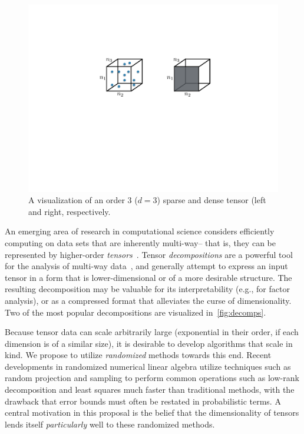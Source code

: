 \begin{figure}
  \centering 
  \includegraphics[width=0.6\linewidth]{thpropfigs/sparseanddense}
  \caption{A visualization of an order 3 ($d=3$) sparse and dense tensor (left and right, respectively.}
  \label{fig:sparseanddense}
\end{figure}
An emerging area of research in computational science considers efficiently computing on data sets that are 
inherently multi-way-- that is, they can be represented by higher-order \emph{tensors}~\cite{Acar09futuredirections}. 
%
%
Tensor \emph{decompositions} are a powerful tool for the analysis of multi-way data~\cite{Kolda:2009}, and generally attempt to express an input tensor in a form that is lower-dimensional or of a more desirable structure. The resulting decomposition may be valuable for its interpretability (e.g., for factor analysis), or as a compressed format that alleviates the curse of dimensionality. Two of the most popular decompositions are visualized in~\cref{fig:decomps}.
%

Because tensor data can scale arbitrarily large (exponential in their order, if each dimension is of a similar size), it is desirable to develop algorithms that scale in kind. We propose to utilize \emph{randomized} methods towards this end.
Recent developments in randomized numerical linear algebra utilize techniques such as random projection and 
sampling to perform common operations such as low-rank 
decomposition and least squares much faster than traditional methods, with the 
drawback that error bounds must often be restated in probabilistic terms. A central motivation in this proposal is the belief that
the dimensionality of tensors lends itself \emph{particularly} well to these randomized methods. 

